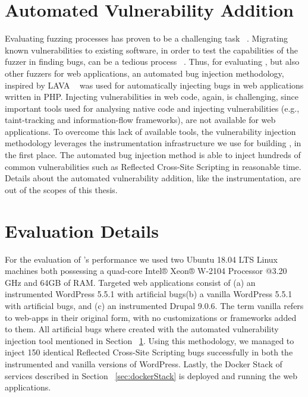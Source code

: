 \section{Automated Vulnerability Addition}\label{sec:automated}
Evaluating fuzzing processes has proven to be a challenging task ~\cite{klees2018Evaluation}. Migrating known vulnerabilities to existing software, in order to test the capabilities of the fuzzer in finding bugs, can be a tedious process ~\cite{bug-reproduction}. Thus, for evaluating \pname{}, but also other fuzzers for web applications, an automated bug injection methodology, inspired by LAVA ~\cite{dolan2016lava} was used for automatically injecting bugs in web applications written in PHP. Injecting vulnerabilities in web code, again, is challenging, since important tools used for analysing native code and injecting vulnerabilities (e.g., taint-tracking and information-flow frameworks), are not available for web applications. To overcome this lack of available tools, the vulnerability injection methodology leverages the instrumentation infrastructure we use for building \pname{}, in the first place. The automated bug injection method is able to inject hundreds of common vulnerabilities such as Reflected Cross-Site Scripting in reasonable time. Details about the automated vulnerability addition, like the instrumentation, are out of the scopes of this thesis.

\section{Evaluation Details}
For the evaluation of \pname{}'s performance we used two Ubuntu 18.04 LTS Linux machines both possessing a quad-core Intel® Xeon® W-2104 Processor @3.20 GHz and 64GB of RAM. Targeted web applications consist of (a) an instrumented WordPress 5.5.1 with artificial bugs(b) a vanilla  WordPress 5.5.1 with artificial bugs, and (c) an instrumented Drupal 9.0.6. The term vanilla refers to web-apps in their original form, with no customizations or frameworks added to them. All artificial bugs where created with the automated vulnerability injection tool mentioned in  Section ~\ref{sec:automated}. Using this methodology, we managed to inject 150 identical Reflected Cross-Site Scripting bugs successfully in both the instrumented and vanilla versions of WordPress. Lastly, the Docker Stack of services described in Section ~\ref{sec:dockerStack} is deployed and running the web applications.